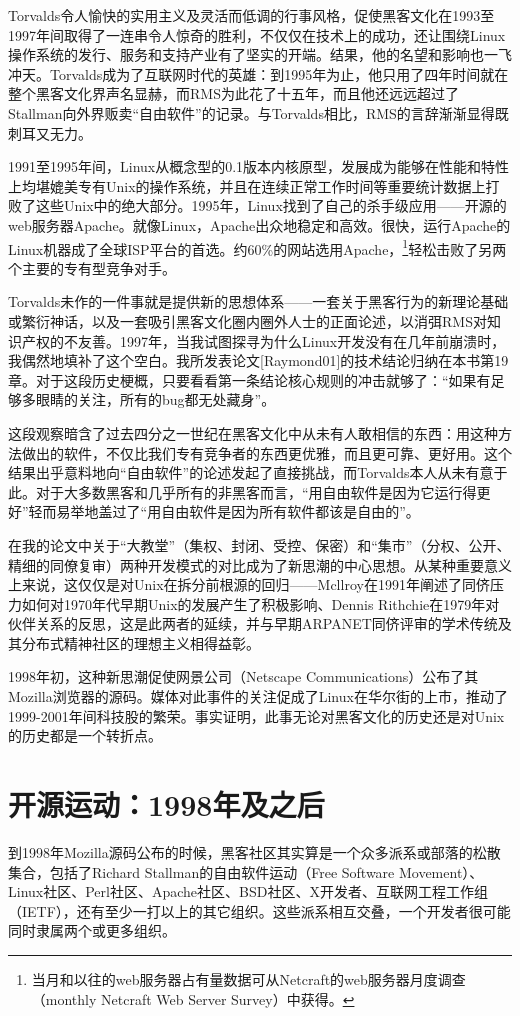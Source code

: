 \documentclass[11pt,oneside]{book}
\begin{document}
\begin{common-format}
Torvalds令人愉快的实用主义及灵活而低调的行事风格，促使黑客文化在1993至1997年间取得了一连串令人惊奇的胜利，不仅仅在技术上的成功，还让围绕Linux操作系统的发行、服务和支持产业有了坚实的开端。结果，他的名望和影响也一飞冲天。Torvalds成为了互联网时代的英雄：到1995年为止，他只用了四年时间就在整个黑客文化界声名显赫，而RMS为此花了十五年，而且他还远远超过了Stallman向外界贩卖“自由软件”的记录。与Torvalds相比，RMS的言辞渐渐显得既刺耳又无力。

1991至1995年间，Linux从概念型的0.1版本内核原型，发展成为能够在性能和特性上均堪媲美专有Unix的操作系统，并且在连续正常工作时间等重要统计数据上打败了这些Unix中的绝大部分。1995年，Linux找到了自己的杀手级应用——开源的web服务器Apache。就像Linux，Apache出众地稳定和高效。很快，运行Apache的Linux机器成了全球ISP平台的首选。约60\%{}的网站选用Apache，\footnote{当月和以往的web服务器占有量数据可从Netcraft的web服务器月度调查（monthly Netcraft Web Server Survey）中获得。}轻松击败了另两个主要的专有型竞争对手。

Torvalds未作的一件事就是提供新的思想体系——一套关于黑客行为的新理论基础或繁衍神话，以及一套吸引黑客文化圈内圈外人士的正面论述，以消弭RMS对知识产权的不友善。1997年，当我试图探寻为什么Linux开发没有在几年前崩溃时，我偶然地填补了这个空白。我所发表论文[Raymond01]的技术结论归纳在本书第19章。对于这段历史梗概，只要看看第一条结论核心规则的冲击就够了：“如果有足够多眼睛的关注，所有的bug都无处藏身”。

这段观察暗含了过去四分之一世纪在黑客文化中从未有人敢相信的东西：用这种方法做出的软件，不仅比我们专有竞争者的东西更优雅，而且更可靠、更好用。这个结果出乎意料地向“自由软件”的论述发起了直接挑战，而Torvalds本人从未有意于此。对于大多数黑客和几乎所有的非黑客而言，“用自由软件是因为它运行得更好”轻而易举地盖过了“用自由软件是因为所有软件都该是自由的”。

在我的论文中关于“大教堂”（集权、封闭、受控、保密）和“集市”（分权、公开、精细的同僚复审）两种开发模式的对比成为了新思潮的中心思想。从某种重要意义上来说，这仅仅是对Unix在拆分前根源的回归——Mcllroy在1991年阐述了同侪压力如何对1970年代早期Unix的发展产生了积极影响、Dennis Rithchie在1979年对伙伴关系的反思，这是此两者的延续，并与早期ARPANET同侪评审的学术传统及其分布式精神社区的理想主义相得益彰。

1998年初，这种新思潮促使网景公司（Netscape Communications）公布了其Mozilla浏览器的源码。媒体对此事件的关注促成了Linux在华尔街的上市，推动了1999-2001年间科技股的繁荣。事实证明，此事无论对黑客文化的历史还是对Unix的历史都是一个转折点。

\section{开源运动：1998年及之后}
到1998年Mozilla源码公布的时候，黑客社区其实算是一个众多派系或部落的松散集合，包括了Richard Stallman的自由软件运动（Free Software Movement）、Linux社区、Perl社区、Apache社区、BSD社区、X开发者、互联网工程工作组（IETF），还有至少一打以上的其它组织。这些派系相互交叠，一个开发者很可能同时隶属两个或更多组织。


\end{common-format}
\end{document}
